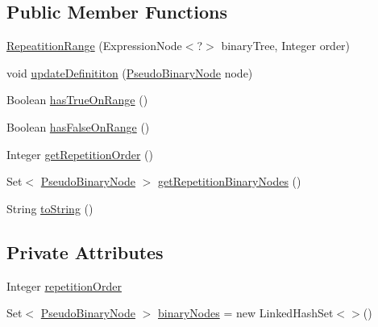 \subsection*{Public Member Functions}
\begin{DoxyCompactItemize}
\item 
\hyperlink{classit_1_1emarolab_1_1cagg_1_1core_1_1language_1_1syntax_1_1expressionTree_1_1expressionNodeTyp7498902e136f0103368e78415adbf7d0_ae134d29e2c12be7809e195c694c7154d}{Repeatition\-Range} (Expression\-Node$<$?$>$ binary\-Tree, Integer order)
\item 
void \hyperlink{classit_1_1emarolab_1_1cagg_1_1core_1_1language_1_1syntax_1_1expressionTree_1_1expressionNodeTyp7498902e136f0103368e78415adbf7d0_aad4b45d51a4384505fc954155c983f74}{update\-Definititon} (\hyperlink{classit_1_1emarolab_1_1cagg_1_1core_1_1PseudoBinaryNode}{Pseudo\-Binary\-Node} node)
\item 
Boolean \hyperlink{classit_1_1emarolab_1_1cagg_1_1core_1_1language_1_1syntax_1_1expressionTree_1_1expressionNodeTyp7498902e136f0103368e78415adbf7d0_a17da5cb73e5899b21133a38455bdc160}{has\-True\-On\-Range} ()
\item 
Boolean \hyperlink{classit_1_1emarolab_1_1cagg_1_1core_1_1language_1_1syntax_1_1expressionTree_1_1expressionNodeTyp7498902e136f0103368e78415adbf7d0_ae0a357c847d982dc6aa6a5ebd403b304}{has\-False\-On\-Range} ()
\item 
Integer \hyperlink{classit_1_1emarolab_1_1cagg_1_1core_1_1language_1_1syntax_1_1expressionTree_1_1expressionNodeTyp7498902e136f0103368e78415adbf7d0_aafb1a6e7a248365f41ffd1bc8d5097e5}{get\-Repetition\-Order} ()
\item 
Set$<$ \hyperlink{classit_1_1emarolab_1_1cagg_1_1core_1_1PseudoBinaryNode}{Pseudo\-Binary\-Node} $>$ \hyperlink{classit_1_1emarolab_1_1cagg_1_1core_1_1language_1_1syntax_1_1expressionTree_1_1expressionNodeTyp7498902e136f0103368e78415adbf7d0_af5460a09e2d146d4a91e4fb45256b5ad}{get\-Repetition\-Binary\-Nodes} ()
\item 
String \hyperlink{classit_1_1emarolab_1_1cagg_1_1core_1_1language_1_1syntax_1_1expressionTree_1_1expressionNodeTyp7498902e136f0103368e78415adbf7d0_ac4b937f72a26708b95d3da6a6d1f610b}{to\-String} ()
\end{DoxyCompactItemize}
\subsection*{Private Attributes}
\begin{DoxyCompactItemize}
\item 
Integer \hyperlink{classit_1_1emarolab_1_1cagg_1_1core_1_1language_1_1syntax_1_1expressionTree_1_1expressionNodeTyp7498902e136f0103368e78415adbf7d0_aa28ffbea59c07cf18c0291c56c5bb025}{repetition\-Order}
\item 
Set$<$ \hyperlink{classit_1_1emarolab_1_1cagg_1_1core_1_1PseudoBinaryNode}{Pseudo\-Binary\-Node} $>$ \hyperlink{classit_1_1emarolab_1_1cagg_1_1core_1_1language_1_1syntax_1_1expressionTree_1_1expressionNodeTyp7498902e136f0103368e78415adbf7d0_a43ea2475fa14878cc0a07e77082d69fa}{binary\-Nodes} = new Linked\-Hash\-Set$<$$>$()
\end{DoxyCompactItemize}


